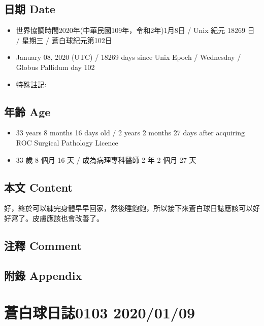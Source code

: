 \documentclass[a5paper, 12pt
]{book}
\providecommand{\tightlist}{%
  \setlength{\itemsep}{0pt}\setlength{\parskip}{0pt}}
\begin{document}
\hypertarget{ux65e5ux671f-date-38}{%
\subsection{日期 Date}\label{ux65e5ux671f-date-38}}

\begin{itemize}
\tightlist
\item
  世界協調時間2020年(中華民國109年，令和2年)1月8日 / Unix 紀元 18269 日
  / 星期三 / 蒼白球紀元第102日
\item
  January 08, 2020 (UTC) / 18269 days since Unix Epoch / Wednesday /
  Globus Pallidum day 102
\item
  特殊註記:
\end{itemize}

\hypertarget{ux5e74ux9f61-age-38}{%
\subsection{年齡 Age}\label{ux5e74ux9f61-age-38}}

\begin{itemize}
\tightlist
\item
  33 years 8 months 16 days old / 2 years 2 months 27 days after
  acquiring ROC Surgical Pathology Licence
\item
  33 歲 8 個月 16 天 / 成為病理專科醫師 2 年 2 個月 27 天
\end{itemize}

\hypertarget{ux672cux6587-content-38}{%
\subsection{本文 Content}\label{ux672cux6587-content-38}}

好，終於可以練完身體早早回家，然後睡飽飽，所以接下來蒼白球日誌應該可以好好寫了。皮膚應該也會改善了。

\hypertarget{ux6ce8ux91cb-comment-37}{%
\subsection{注釋 Comment}\label{ux6ce8ux91cb-comment-37}}

\hypertarget{ux9644ux9304-appendix-38}{%
\subsection{附錄 Appendix}\label{ux9644ux9304-appendix-38}}

\hypertarget{ux84bcux767dux7403ux65e5ux8a8c0103-20200109}{%
\section{蒼白球日誌0103
2020/01/09}\label{ux84bcux767dux7403ux65e5ux8a8c0103-20200109}}
\end{document}

